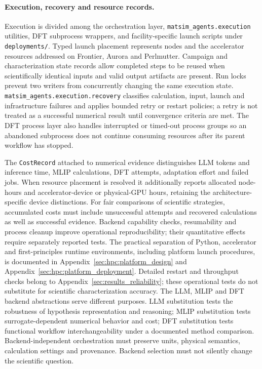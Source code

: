 \documentclass[11pt,a4paper]{article}
\def\ac#1{#1}%
\begin{document}
\paragraph{Execution, recovery and resource records.}
Execution is divided among the orchestration layer, \texttt{matsim\_agents.execution} utilities, \ac{DFT} subprocess wrappers, and facility-specific launch scripts under \texttt{deployments/}. Typed launch placement represents nodes and the accelerator resources addressed on Frontier, Aurora and Perlmutter. Campaign and characterization state records allow completed steps to be reused when scientifically identical inputs and valid output artifacts are present. Run locks prevent two writers from concurrently changing the same execution state. \texttt{matsim\_agents.execution.recovery} classifies calculation, input, launch and infrastructure failures and applies bounded retry or restart policies; a retry is not treated as a successful numerical result until convergence criteria are met. The \ac{DFT} process layer also handles interrupted or timed-out process groups so an abandoned subprocess does not continue consuming resources after its parent workflow has stopped.

The \texttt{CostRecord} attached to numerical evidence distinguishes LLM tokens and inference time, MLIP calculations, DFT attempts, adaptation effort and failed jobs. When resource placement is resolved it additionally reports allocated node-hours and accelerator-device or physical-GPU hours, retaining the architecture-specific device distinctions. For fair comparisons of scientific strategies, accumulated costs must include unsuccessful attempts and recovered calculations as well as successful evidence. Backend capability checks, resumability and process cleanup improve operational reproducibility; their quantitative effects require separately reported tests. The practical separation of Python, accelerator and first-principles runtime environments, including platform launch procedures, is documented in Appendix~\ref{sec:hpc:platform_design} and Appendix~\ref{sec:hpc:platform_deployment}. Detailed restart and throughput checks belong to Appendix~\ref{sec:results_reliability}; these operational tests do not substitute for scientific characterization accuracy.
The LLM, MLIP and DFT backend abstractions serve different purposes. LLM substitution tests the robustness of hypothesis representation and reasoning; MLIP substitution tests surrogate-dependent numerical behavior and cost; DFT substitution tests functional workflow interchangeability under a documented method comparison. Backend-independent orchestration must preserve units, physical semantics, calculation settings and provenance. Backend selection must not silently change the scientific question.
\end{document}
